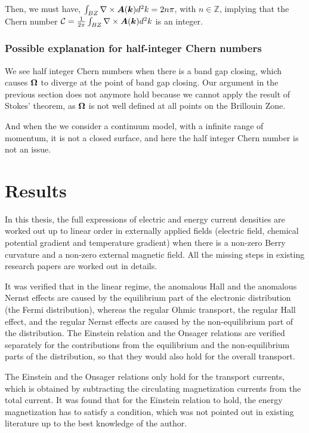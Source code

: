 \documentclass{report}
\renewcommand\vec[1]{\ensuremath\boldsymbol{#1}} %
\begin{document}
Then, we must have, $\int_{B Z} \nabla \times \vec{A}(\vec{k}) d^2 k = 2 n \pi$, with $n \in \mathbb{Z}$, implying that the Chern number $\mathcal{C}=\frac{1}{2\pi} \int_{B Z} \nabla \times \vec{A}(\vec{k}) d^2 k$ is an integer.

\subsection{Possible explanation for half-integer Chern numbers}
We see half integer Chern numbers when there is a band gap closing, which causes $\vec{\Omega}$ to diverge at the point of band gap closing. Our argument in the previous section does not anymore hold because we cannot apply the result of Stokes' theorem, as $\vec{\Omega}$ is not well defined at all points on the Brillouin Zone.

And when the we consider a continuum model, with a infinite range of momentum, it is not a closed surface, and here the half integer Chern number is not an issue. 


\chapter{Results}
In this thesis, the full expressions of electric and energy current densities are worked out up to linear order in externally applied fields (electric field, chemical potential gradient and temperature gradient) when there is a non-zero Berry curvature and a non-zero external magnetic field. All the missing steps in existing research papers are worked out in details.

It was verified that in the linear regime, the anomalous Hall and the anomalous Nernst effects are caused by the equilibrium part of the electronic distribution (the Fermi distribution), whereas the regular Ohmic transport, the regular Hall effect, and the regular Nernst effects are caused by the non-equilibrium part of the distribution. The Einstein relation and the Onsager relations are verified separately for the contributions from the equilibrium and the non-equilibrium parts of the distribution, so that they would also hold for the overall transport.

The Einstein and the Onsager relations only hold for the transport currents, which is obtained by subtracting the circulating magnetization currents from the total current. It was found that for the Einstein relation to hold, the energy magnetization has to satisfy a condition, which was not pointed out in existing literature up to the best knowledge of the author.
\end{document}
